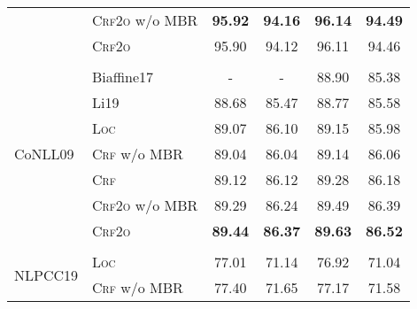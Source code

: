 \begin{table}[tb!]
\begin{tabular}{llcccc}
                                 & \textsc{Crf2o} w/o MBR & \textbf{95.92}          & \textbf{94.16}           & \textbf{96.14}                   & \textbf{94.49}                   \\
                                 & \textsc{Crf2o}         & 95.90                   & 94.12                    & 96.11                            & 94.46                            \\[2pt]
        \hline
        \\[-15pt]
        \multirow{7}{*}{CoNLL09} & Biaffine17             & -                       & -                        & 88.90                            & 85.38                            \\
                                 & Li19                   & 88.68                   & 85.47                    & 88.77                            & 85.58                            \\[3pt]
                                 & \textsc{Loc}           & 89.07                   & 86.10                    & 89.15                            & 85.98                            \\
                                 & \textsc{Crf} w/o MBR   & 89.04                   & 86.04                    & 89.14                            & 86.06                            \\
                                 & \textsc{Crf}           & 89.12                   & 86.12                    & 89.28                            & 86.18\rlap{$^\dagger$}           \\
                                 & \textsc{Crf2o} w/o MBR & 89.29                   & 86.24                    & 89.49                            & 86.39                            \\
                                 & \textsc{Crf2o}         & \textbf{89.44}          & \textbf{86.37}           & \textbf{89.63}\rlap{$^\ddagger$} & \textbf{86.52}\rlap{$^\ddagger$} \\[2pt]
        \hline
        \\[-15pt]
        \multirow{5}{*}{NLPCC19} & \textsc{Loc}           & 77.01                   & 71.14                    & 76.92                            & 71.04                            \\
                                 & \textsc{Crf} w/o MBR   & 77.40                   & 71.65                    & 77.17                            & 71.58                            \\

\end{tabular}
\end{table}
